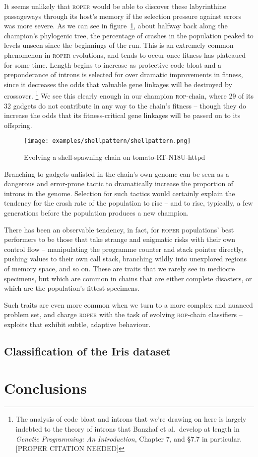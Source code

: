 It seems unlikely that \textsc{roper} would be able to discover
these labyrinthine passageways through its host's memory if the
selection pressure against errors was more severe.
As we can see in figure~\ref{shellpattern-graph}, about halfway
back along the champion's phylogenic tree, the percentage of
crashes in the population peaked to levels unseen since the
beginnings of the run. This is an extremely common phenomenon in
\textsc{roper} evolutions, and tends to occur once fitness has
plateaued for some time. Length begins to increase as protective
code bloat and a preponderance of introns is selected for over
dramatic improvements in fitness, since it decreases the odds
that valuable gene linkages will be destroyed by crossover.%
\footnote{The analysis of code bloat and introns that we're
  drawing on here is largely indebted to the theory of introns that
  Banzhaf et al.\ develop at length in \emph{Genetic Programming: An
  Introduction}, Chapter 7, and \S{7.7} in particular. [PROPER
  CITATION NEEDED]}
We see this clearly enough in our champion \textsc{rop}-chain,
where 29 of its 32 gadgets do not contribute in any way to the
chain's fitness -- though they do increase the odds that its
fitness-critical gene linkages will be passed on to its
offspring. 
\begin{figure}
  \texttt{[image: examples/shellpattern/shellpattern.png]}
  \caption{Evolving a shell-spawning chain on {tomato-RT-N18U-httpd}}
  \label{shellpattern-graph}
\end{figure}

Branching to gadgets unlisted in the chain's own genome can be
seen as a dangerous and error-prone tactic to dramatically
increase the proportion of introns in the genome. Selection for
such tactics would certainly explain the tendency for the crash
rate of the population to rise -- and to rise, typically, a few
generations before the population produces a new champion. 

There has been an observable tendency, in fact, for
\textsc{roper} populations' best performers to be those that take
strange and enigmatic risks with their own control flow --
manipulating the programme counter and stack pointer directly,
pushing values to their own call stack, branching wildly into
unexplored regions of memory space, and so on. These are traits
that we rarely see in mediocre specimens, but which are common in
chains that are either complete disasters, or which are the
population's fittest specimens. 

Such traits are even more common when we turn to a more complex
and nuanced problem set, and charge \textsc{roper} with the task
of evolving \textsc{rop}-chain classifiers -- exploits that
exhibit subtle, adaptive behaviour. 

\subsection{Classification of the Iris dataset}

\section{Conclusions}



\begin{acks}


\end{acks}
